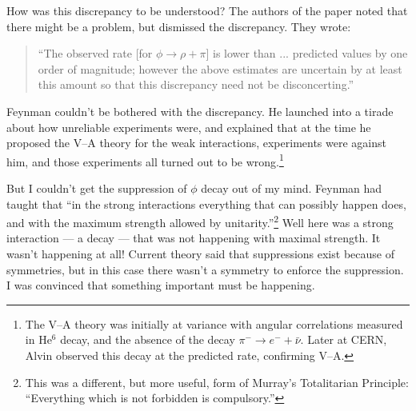 \documentclass[12pt]{article}
\begin{document}
How was this discrepancy to be understood? The authors of the paper noted that there might be a problem, but dismissed the discrepancy. They wrote:
\begin{quote}
``The observed rate [for $\phi\to\rho+\pi$]  is lower than ... predicted values by one order of magnitude; however the above estimates are uncertain by at least this amount so that this discrepancy need not be disconcerting.'' 
\end{quote}

Feynman couldn't be bothered with the discrepancy. He launched into a tirade about how unreliable experiments were, and explained that at the time he proposed the V--A theory for the weak interactions,  experiments were against him, and those experiments all turned out to be wrong.\footnote{The V--A theory was initially at variance with angular correlations measured in He${^{6}}$ decay, and the absence of the decay $\pi^{-} \to e^{-}+\bar\nu$. Later at CERN, Alvin observed this decay at the predicted rate, confirming V--A.}

But I couldn't get the suppression of $\phi$ decay out of my mind. Feynman had taught that ``in the strong interactions everything that can possibly happen does, and with the maximum strength allowed by unitarity.''\footnote{This was a different, but more useful, form of Murray's Totalitarian Principle:  ``Everything which is not forbidden is compulsory.''}  Well here was a strong interaction --- a decay --- that was not happening with maximal strength.  It wasn't happening at all! Current theory said that suppressions exist because of symmetries, but in this case there wasn't a symmetry to enforce the suppression. I was convinced that something important must be happening.
\end{document}
